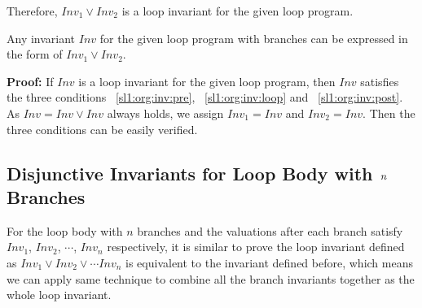 Therefore, $Inv_1 \vee Inv_2$ is a loop invariant for the given loop program. %

\begin{theorem}
\label{thm:invariant:is:disjunctive}
	Any invariant $Inv$ for the given loop program with branches can be expressed in the form of $Inv_1 \vee Inv_2$.
\end{theorem}

\noindent \textbf{Proof:} If $Inv$ is a loop invariant for the given loop program,
then $Inv$ satisfies the three conditions ~\ref{sl1:org:inv:pre}, ~\ref{sl1:org:inv:loop} and ~\ref{sl1:org:inv:post}.
As $Inv = Inv \vee Inv$ always holds, we assign $Inv_1 = Inv$ and $Inv_2 = Inv$.
Then the three conditions can be easily verified. %

\subsection{Disjunctive Invariants for Loop Body with $\emph{n}$ Branches}
For the loop body with $n$ branches and the valuations after each branch satisfy $Inv_1$, $Inv_2$, $\cdots$, $Inv_n$ respectively,
it is similar to prove the loop invariant defined as $Inv_1 \vee Inv_2 \vee \cdots Inv_n$ is equivalent to the invariant defined before,
which means we can apply same technique to combine all the branch invariants together as the whole loop invariant.



